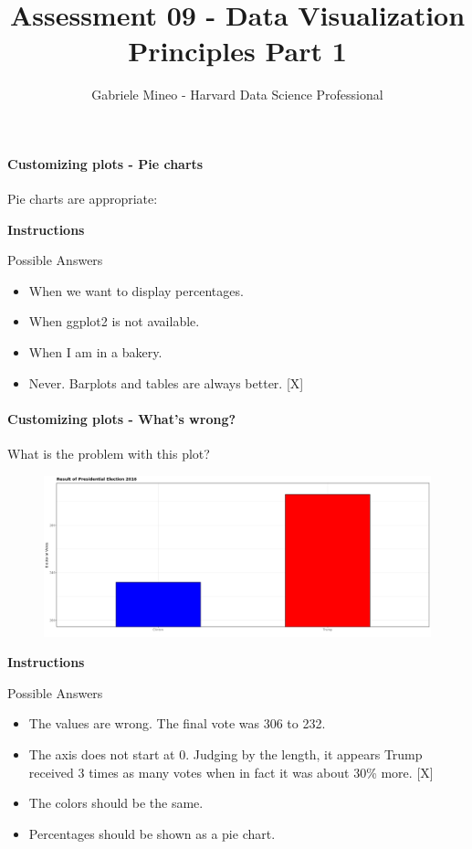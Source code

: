 \documentclass[]{article}
\title{Assessment 09 - Data Visualization Principles Part 1}
\author{Gabriele Mineo - Harvard Data Science Professional}
\date{}
\providecommand{\tightlist}{%
  \setlength{\itemsep}{0pt}\setlength{\parskip}{0pt}}
\let\oldparagraph\paragraph
\renewcommand{\paragraph}[1]{\oldparagraph{#1}\mbox{}}
\begin{document}
\maketitle

\paragraph{\texorpdfstring{\textbf{Customizing plots - Pie
charts}}{Customizing plots - Pie charts}}\label{customizing-plots---pie-charts}

Pie charts are appropriate:

\textbf{Instructions}

Possible Answers

\begin{itemize}
\tightlist
\item
  When we want to display percentages.
\item
  When ggplot2 is not available.
\item
  When I am in a bakery.
\item
  Never. Barplots and tables are always better. {[}X{]}
\end{itemize}

\paragraph{\texorpdfstring{\textbf{Customizing plots - What's
wrong?}}{Customizing plots - What's wrong?}}\label{customizing-plots---whats-wrong}

What is the problem with this plot?

\begin{figure}
\centering
\includegraphics{ex-2.png}
\caption{}
\end{figure}

\textbf{Instructions}

Possible Answers

\begin{itemize}
\tightlist
\item
  The values are wrong. The final vote was 306 to 232.
\item
  The axis does not start at 0. Judging by the length, it appears Trump
  received 3 times as many votes when in fact it was about 30\% more.
  {[}X{]}
\item
  The colors should be the same.
\item
  Percentages should be shown as a pie chart.
\end{itemize}
\end{document}
